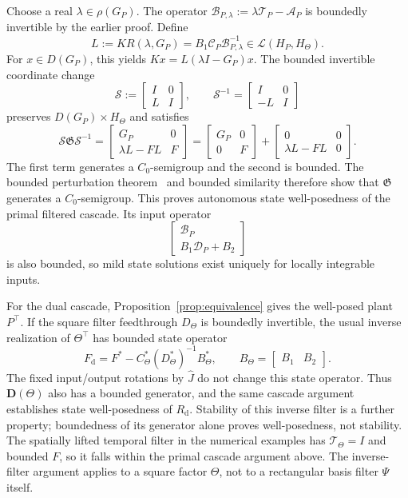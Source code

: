 \documentclass[11pt,a4paper]{article}
\begin{document}
Choose a real $\lambda\in\rho(G_P)$. The operator
$\mathcal B_{P,\lambda}:=\lambda\mathcal T_P-\mathcal A_P$ is
boundedly invertible by the earlier proof. Define
\[
 L:=KR(\lambda,G_P)
   =B_1\mathcal C_P\mathcal B_{P,\lambda}^{-1}
   \in\mathcal L(H_P,H_\Theta).
\]
For $x\in D(G_P)$, this yields $Kx=L(\lambda I-G_P)x$.
The bounded invertible coordinate change
\[
 \mathcal S:=\begin{bmatrix}I&0\\L&I\end{bmatrix},
 \qquad
 \mathcal S^{-1}=\begin{bmatrix}I&0\\-L&I\end{bmatrix}
\]
preserves $D(G_P)\times H_\Theta$ and satisfies
\begin{equation}\label{eq:bounded-cascade}
 \mathcal S\mathfrak G\mathcal S^{-1}
 =\begin{bmatrix}G_P&0\\\lambda L-FL&F\end{bmatrix}
 =\begin{bmatrix}G_P&0\\0&F\end{bmatrix}
  +\begin{bmatrix}0&0\\\lambda L-FL&0\end{bmatrix}.
\end{equation}
The first term generates a $C_0$-semigroup and the second is bounded.
The bounded perturbation theorem~\cite[Thm.~3.4]{schnaubelt} and bounded
similarity therefore show that $\mathfrak G$ generates a $C_0$-semigroup.
This proves autonomous state well-posedness of the primal filtered cascade.
Its input operator
\[
 \begin{bmatrix}\mathcal B_P\\B_1\mathcal D_P+B_2\end{bmatrix}
\]
is also bounded,
so mild state solutions exist uniquely for locally integrable inputs.

For the dual cascade, Proposition~\ref{prop:equivalence} gives the
well-posed plant $P^\top$. If the square filter feedthrough $D_\Theta$
is boundedly invertible, the usual inverse realization of $\Theta^\top$
has bounded state operator
\[
 F_{\mathrm d}=F^*-C_\Theta^*(D_\Theta^*)^{-1}B_\Theta^*,
 \qquad B_\Theta=\begin{bmatrix}B_1&B_2\end{bmatrix}.
\]
The fixed input/output rotations by $\widehat J$ do not change this
state operator. Thus $\mathbf D(\Theta)$ also has a bounded generator,
and the same cascade argument establishes state well-posedness of
$R_{\mathrm d}$. Stability of this inverse filter is a further property;
boundedness of its generator alone proves well-posedness, not stability.
The spatially lifted temporal filter in the numerical examples has
$\mathcal T_\Theta=I$ and bounded $F$, so it falls within the primal
cascade argument above. The inverse-filter argument applies to a square
factor $\Theta$, not to a rectangular basis filter $\Psi$ itself.
\end{document}
